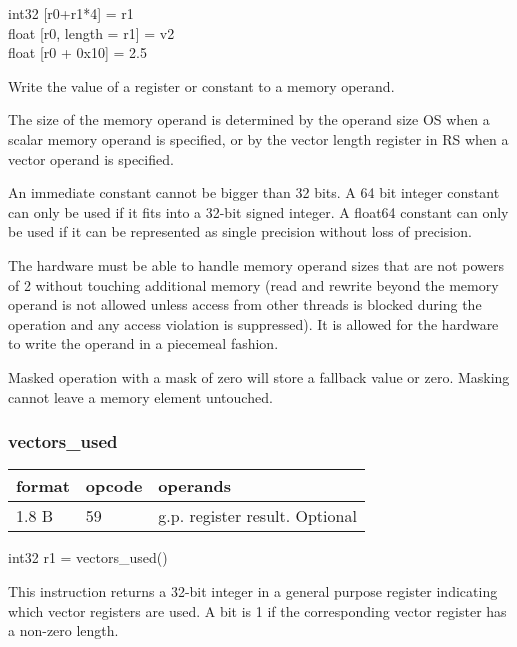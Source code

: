 \documentclass[forwardcom.tex]{subfiles}
\begin{document}
int32 [r0+r1*4] = r1\\ 
float [r0, length = r1] = v2 \\
float [r0 + 0x10] = 2.5
\vspace{2mm}

Write the value of a register or constant to a memory operand.
\vspace{2mm}

The size of the memory operand is determined by the operand size OS when a scalar memory operand is specified, or by the vector length register in RS when a vector operand is specified.
\vspace{2mm}

An immediate constant cannot be bigger than 32 bits. A 64 bit integer constant can only be used if it fits into a 32-bit signed integer. A float64 constant can only be used if it can be represented as single precision without loss of precision.
\vspace{2mm}

The hardware must be able to handle memory operand sizes that are not powers of 2 without touching additional memory (read and rewrite beyond the memory operand is not allowed unless access from other threads is blocked during the operation and any access violation is suppressed). 
It is allowed for the hardware to write the operand in a piecemeal fashion.
\vspace{2mm}

Masked operation with a mask of zero will store a fallback value or zero. Masking cannot leave a memory element untouched.
\vspace{2mm}

\subsubsection{vectors\_used}
\label{table:vectorsUusedInstruction}
\begin{tabular}{|p{12mm}|p{12mm}|p{110mm}|}
\hline
\bfseries format & \bfseries opcode & \bfseries operands \\ \hline
1.8 B & 59 & g.p. register result. Optional \\ \hline
\end{tabular}
\vspace{2mm}

int32 r1 = vectors\_used()
\vspace{2mm}

This instruction returns a 32-bit integer in a general purpose register indicating which vector registers are used. A bit is 1 if the corresponding vector register has a non-zero length.
\vspace{2mm}
\end{document}
